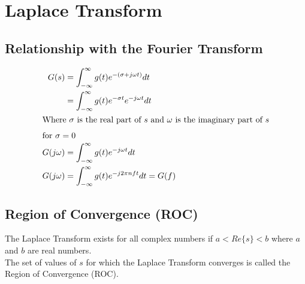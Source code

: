 \documentclass[oneside]{book}
\begin{document}
        \chapter{Laplace Transform}
            \section{Relationship with the Fourier Transform}
                \begin{align*}
                    G(s) &= \int^{\infty}_{-\infty} g(t) e^{-\left(\sigma + j\omega t \right)} dt\\
                    &= \int^{\infty}_{-\infty} g(t) e^{-\sigma t} e^{-j\omega t} dt\\
                    \intertext{Where $\sigma$ is the real part of $s$ and $\omega$ is the imaginary part of $s$}
                    \intertext{for $\sigma = 0$}
                    G(j\omega) &= \int^{\infty}_{-\infty} g(t) e^{-j\omega t} dt\\
                    G(j\omega) &= \int^{\infty}_{-\infty} g(t) e^{-j2\pi n ft} dt = G(f)\\
                \end{align*}
            \section{Region of Convergence (ROC)}
                The Laplace Transform exists for all complex numbers if $a < Re\{s\} < b$ where $a$ and $b$ are real numbers.\\
                The set of values of $s$ for which the Laplace Transform converges is called the Region of Convergence (ROC).\\
\end{document}

